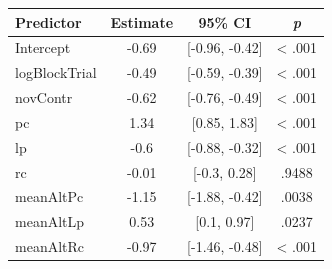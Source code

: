 \begin{tabular}{lccc}
\hline
Predictor & Estimate & 95\% CI & \textit{p} \\
\hline
Intercept & -0.69 & {[}-0.96, -0.42{]} & \textless{} .001 \\
logBlockTrial & -0.49 & {[}-0.59, -0.39{]} & \textless{} .001 \\
novContr & -0.62 & {[}-0.76, -0.49{]} & \textless{} .001 \\
pc & 1.34 & {[}0.85, 1.83{]} & \textless{} .001 \\
lp & -0.6 & {[}-0.88, -0.32{]} & \textless{} .001 \\
rc & -0.01 & {[}-0.3, 0.28{]} & .9488 \\
meanAltPc & -1.15 & {[}-1.88, -0.42{]} & .0038 \\
meanAltLp & 0.53 & {[}0.1, 0.97{]} & .0237 \\
meanAltRc & -0.97 & {[}-1.46, -0.48{]} & \textless{} .001 \\
\hline
\end{tabular}
